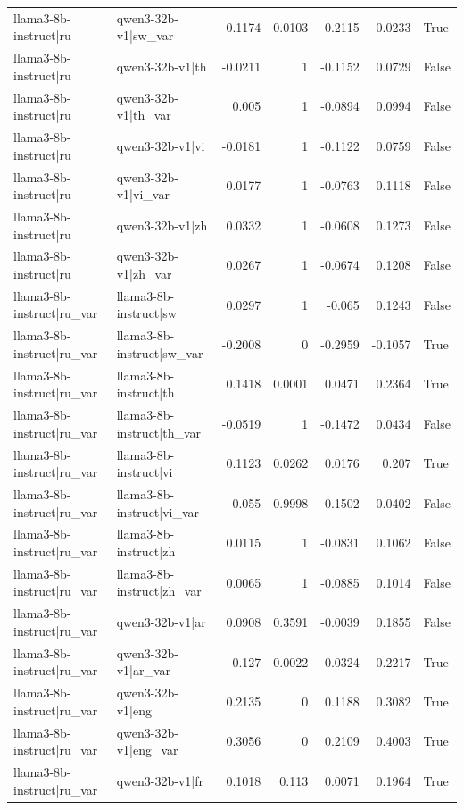 \begin{table}
\begin{tabular}{l l r r r r l}
llama3-8b-instruct|ru & qwen3-32b-v1|sw_var & -0.1174 & 0.0103 & -0.2115 & -0.0233 & True \\
llama3-8b-instruct|ru & qwen3-32b-v1|th & -0.0211 & 1 & -0.1152 & 0.0729 & False \\
llama3-8b-instruct|ru & qwen3-32b-v1|th_var & 0.005 & 1 & -0.0894 & 0.0994 & False \\
llama3-8b-instruct|ru & qwen3-32b-v1|vi & -0.0181 & 1 & -0.1122 & 0.0759 & False \\
llama3-8b-instruct|ru & qwen3-32b-v1|vi_var & 0.0177 & 1 & -0.0763 & 0.1118 & False \\
llama3-8b-instruct|ru & qwen3-32b-v1|zh & 0.0332 & 1 & -0.0608 & 0.1273 & False \\
llama3-8b-instruct|ru & qwen3-32b-v1|zh_var & 0.0267 & 1 & -0.0674 & 0.1208 & False \\
llama3-8b-instruct|ru_var & llama3-8b-instruct|sw & 0.0297 & 1 & -0.065 & 0.1243 & False \\
llama3-8b-instruct|ru_var & llama3-8b-instruct|sw_var & -0.2008 & 0 & -0.2959 & -0.1057 & True \\
llama3-8b-instruct|ru_var & llama3-8b-instruct|th & 0.1418 & 0.0001 & 0.0471 & 0.2364 & True \\
llama3-8b-instruct|ru_var & llama3-8b-instruct|th_var & -0.0519 & 1 & -0.1472 & 0.0434 & False \\
llama3-8b-instruct|ru_var & llama3-8b-instruct|vi & 0.1123 & 0.0262 & 0.0176 & 0.207 & True \\
llama3-8b-instruct|ru_var & llama3-8b-instruct|vi_var & -0.055 & 0.9998 & -0.1502 & 0.0402 & False \\
llama3-8b-instruct|ru_var & llama3-8b-instruct|zh & 0.0115 & 1 & -0.0831 & 0.1062 & False \\
llama3-8b-instruct|ru_var & llama3-8b-instruct|zh_var & 0.0065 & 1 & -0.0885 & 0.1014 & False \\
llama3-8b-instruct|ru_var & qwen3-32b-v1|ar & 0.0908 & 0.3591 & -0.0039 & 0.1855 & False \\
llama3-8b-instruct|ru_var & qwen3-32b-v1|ar_var & 0.127 & 0.0022 & 0.0324 & 0.2217 & True \\
llama3-8b-instruct|ru_var & qwen3-32b-v1|eng & 0.2135 & 0 & 0.1188 & 0.3082 & True \\
llama3-8b-instruct|ru_var & qwen3-32b-v1|eng_var & 0.3056 & 0 & 0.2109 & 0.4003 & True \\
llama3-8b-instruct|ru_var & qwen3-32b-v1|fr & 0.1018 & 0.113 & 0.0071 & 0.1964 & True \\

\end{tabular}
\end{table}
